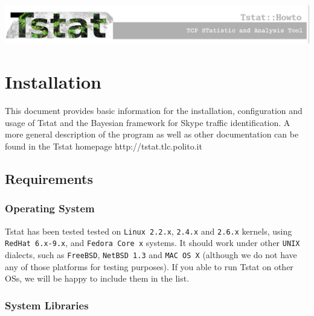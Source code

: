 \documentclass[11pt]{article}
\begin{document}
\begin{center}
    \includegraphics[width=\textwidth]{tstat_banner.eps}
\end{center}
\tableofcontents



\clearpage

       \selectfont


\section{Installation\label{Installation}}


This document provides basic information
for the installation, configuration and usage 
of Tstat and the Bayesian framework for Skype
traffic identification.  A more general
description of the program as well as other
documentation can be found in the Tstat homepage
\textsf{http://tstat.tlc.polito.it}

\subsection{Requirements\label{Requirements}}
\subsubsection{Operating System\label{Operating_System}}


Tstat has been tested tested on \texttt{Linux 2.2.x}, \texttt{2.4.x} and \texttt{2.6.x} kernels, 
using \texttt{RedHat 6.x-9.x}, and \texttt{Fedora Core x} systems. 
It should work under other \texttt{UNIX} dialects, such as 
\texttt{FreeBSD}, \texttt{NetBSD 1.3} and \texttt{MAC OS X} (although we do not have any of 
those platforms for testing purposes). If you able to run Tstat on other OSs, we
will be happy to include them in the list.

\subsubsection{System Libraries\label{System_Libraries}}
\end{document}
